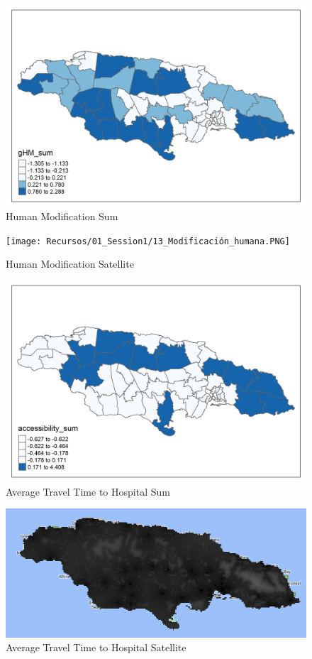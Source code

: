 \documentclass[
  12pt,
]{book}
\begin{document}
\begin{figure}
\centering
\includegraphics{Recursos/01_Session1/12_gHM_sum.png}
\caption{Human Modification Sum}
\end{figure}

\begin{figure}
\centering
\texttt{[image: Recursos/01\_Session1/13\_Modificación\_humana.PNG]}
\caption{Human Modification Satellite}
\end{figure}

\begin{figure}
\centering
\includegraphics{Recursos/01_Session1/14_accessibility_sum.png}
\caption{Average Travel Time to Hospital Sum}
\end{figure}

\begin{figure}
\centering
\includegraphics{Recursos/01_Session1/15_Distancia_Hospitales.PNG}
\caption{Average Travel Time to Hospital Satellite}
\end{figure}
\end{document}
